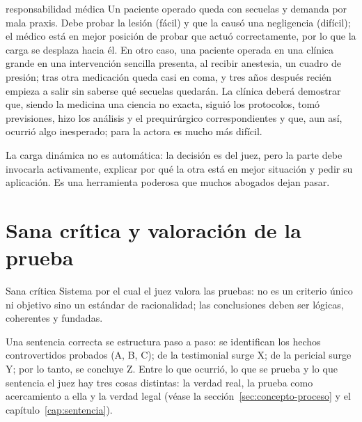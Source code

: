 \documentclass[12pt,oneside]{book}
\begin{document}
\begin{ejemplo}{responsabilidad médica}
Un paciente operado queda con secuelas y demanda por mala praxis. Debe probar la lesión (fácil) y que la causó una negligencia (difícil); el médico está en mejor posición de probar que actuó correctamente, por lo que la carga se desplaza hacia él. En otro caso, una paciente operada en una clínica grande en una intervención sencilla presenta, al recibir anestesia, un cuadro de presión; tras otra medicación queda casi en coma, y tres años después recién empieza a salir sin saberse qué secuelas quedarán. La clínica deberá demostrar que, siendo la medicina una ciencia no exacta, siguió los protocolos, tomó previsiones, hizo los análisis y el prequirúrgico correspondientes y que, aun así, ocurrió algo inesperado; para la actora es mucho más difícil.
\end{ejemplo}

\begin{importante}
La carga dinámica no es automática: la decisión es del juez, pero la parte debe invocarla activamente, explicar por qué la otra está en mejor situación y pedir su aplicación. Es una herramienta poderosa que muchos abogados dejan pasar.
\end{importante}

\section{Sana crítica y valoración de la prueba}

\begin{definicion}{Sana crítica}
Sistema por el cual el juez valora las pruebas: no es un criterio único ni objetivo sino un estándar de racionalidad; las conclusiones deben ser lógicas, coherentes y fundadas.
\end{definicion}

Una sentencia correcta se estructura paso a paso: se identifican los hechos controvertidos probados (A, B, C); de la testimonial surge X; de la pericial surge Y; por lo tanto, se concluye Z. Entre lo que ocurrió, lo que se prueba y lo que sentencia el juez hay tres cosas distintas: la verdad real, la prueba como acercamiento a ella y la verdad legal (véase la sección~\ref{sec:concepto-proceso} y el capítulo~\ref{cap:sentencia}).
\end{document}
